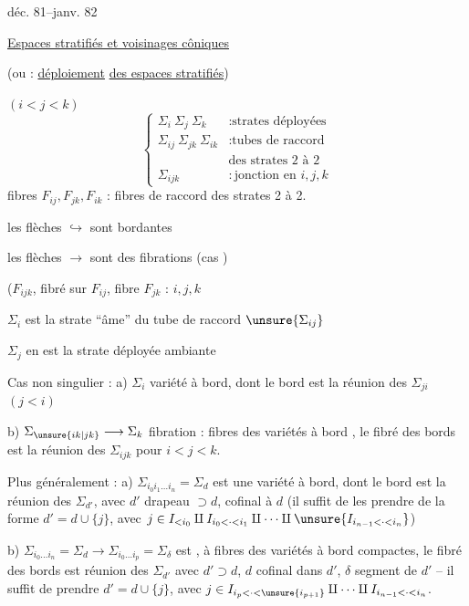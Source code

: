 déc. 81--janv. 82

\uline{Espaces stratifiés et voisinages côniques}

(ou : \uline{déploiement} \uline{des espaces stratifiés})


$(i<j<k)$
\[
\left\{\begin{array}{ll}
\Sigma_i\ \Sigma_j\ \Sigma_k &: \text{strates déployées}\\
\Sigma_{ij}\ \Sigma_{jk}\ \Sigma_{ik} &: \text{tubes de raccord}\\
&\text{des strates 2 à 2}\\
\Sigma_{ijk} &: \text{jonction en }i,j,k
\end{array}\right.
\]
fibres $F_{ij},F_{jk},F_{ik}$ : fibres de raccord
 des strates 2 à 2.

les flèches $\hookrightarrow$ sont bordantes

les flèches $\longrightarrow$ sont des fibrations 
(cas )

($F_{ijk}$, fibré sur $F_{ij}$, fibre $F_{jk}$ : 
 $i,j,k$

$\Sigma_i$ est la strate  ``âme'' du tube de raccord $\unsure{\Sigma_{ij}}$

$\Sigma_j$ en est la strate déployée ambiante

Cas non singulier : a) $\Sigma_i$ variété à bord, dont le bord est
la réunion des $\Sigma_{ji}$ $(j<i)$

b) $\Sigma_{\unsure{ik|jk}}\longrightarrow\Sigma_k$ fibration : fibres des
variétés à bord , le fibré des bords est
la réunion des $\Sigma_{ijk}$ pour $i<j<k$.

Plus généralement : a) $\Sigma_{i_0i_1\ldots i_n}=\Sigma_d$ est une
variété à bord, dont le bord est la réunion des
$\Sigma_{d'}$, avec $d'$ drapeau $\supset d$, cofinal à $d$
(il suffit de les prendre de la forme $d'=d\cup\{j\}$,
avec $j\in I_{<i_0}\amalg I_{i_0<\cdot<i_1}\amalg\cdots\amalg\unsure{I_{i_{n-1}<\cdot<i_n}}$)

b) $\Sigma_{i_0\ldots i_n}=\Sigma_d\longrightarrow\Sigma_{i_0\ldots i_p}=\Sigma_\delta$
est , à fibres des variétés à bord compactes,
le fibré des bords est réunion des $\Sigma_{d'}$
avec $d'\supset d$, $d$ cofinal dans $d'$, $\delta$ segment 
de $d'$ -- il suffit de prendre $d'=d\cup\{j\}$, avec
$j\in I_{i_p<\cdot<\unsure{i_{p+1}}}\amalg\cdots\amalg I_{i_{n-1}<\cdot<i_n}$.

